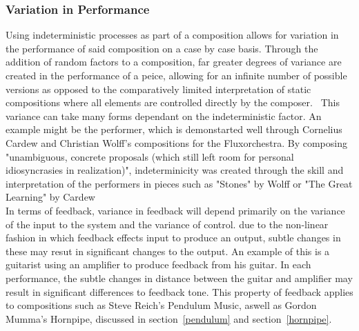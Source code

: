 \documentclass[titlepage]{scrartcl}
\begin{document}
    \subsubsection{Variation in Performance}\label{variance}
    Using indeterministic processes as part of a composition allows for
    variation in the performance of said composition on a case by case basis.
    Through the addition of random factors to a composition, far greater
    degrees of variance are created in the performance of a peice, allowing for
    an infinite number of possible versions as opposed to the comparatively
    limited interpretation of static compositions where all elements are
    controlled directly by the composer.~\parencite[p.97-98, 381]{jc2009co,
    holmes2012eaem}
    This variance can take many forms dependant on the indeterministic factor.
    An example might be the performer, which is demonstarted well through
    Cornelius Cardew and Christian Wolff's compositions for the Fluxorchestra.
    By composing "unambiguous, concrete proposals (which still left room for
    personal idiosyncrasies in realization)", indeterminicity was created
    through the skill and interpretation of the performers in pieces such as
    "Stones" by Wolff or "The Great Learning" by
    Cardew~\parencite[110]{nyman1999em}\\
    In terms of feedback, variance in feedback will depend primarily on the
    variance of the input to the system and the variance of control. due to the
    non-linear fashion in which feedback effects input to produce an output,
    subtle changes in these may resut in significant changes to the output. An
    example of this is a guitarist using an amplifier to produce feedback from
    his guitar. In each performance, the subtle changes in distance between the
    guitar and amplifier may result in significant differences to feedback
    tone. This property of feedback applies to compositions such as Steve
    Reich's Pendulum Music, aswell as Gordon Mumma's Hornpipe, discussed in
    section~\ref{pendulum} and section~\ref{hornpipe}.
\end{document}
